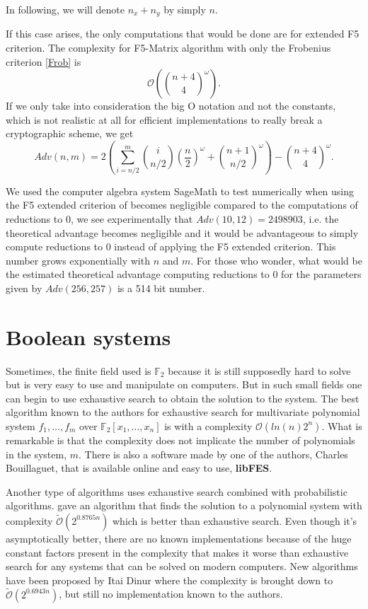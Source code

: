 \documentclass[english]{article}
\begin{document}
		 In following, we will denote $n_x + n_y$ by simply $n$.
		 
		 If this case arises, the only computations that would be done are for extended F5 criterion. The complexity for F5-Matrix algorithm with only the Frobenius criterion \ref{Frob} is 
		 $$
		 \mathcal{O}\left(\binom{n + 4}{4}^\omega\right).
		 $$
		 If we only take into consideration the big O notation and not the constants, which is not realistic at all for efficient implementations to really break a cryptographic scheme, we get
		 \begin{equation}
		 Adv(n, m) = 2\left(\sum_{i = n/2}^{m}\binom{i}{n/2}\left(\frac{n}{2}\right)^\omega + \binom{n + 1}{n/2}^\omega\right) - \binom{n + 4}{4}^\omega.
		 \label{equation_complex}
		 \end{equation}
		 
		 We used the computer algebra system SageMath \cite{sagemath} to test numerically when using the F5 extended criterion of \cite{FSS11} becomes negligible compared to the computations of reductions to 0, we see experimentally that $Adv(10, 12) = 2498903$, i.e. the theoretical advantage becomes negligible and it would be advantageous to simply compute reductions to 0 instead of applying the F5 extended criterion. This number grows exponentially with $n$ and $m$. For those who wonder, what would be the estimated theoretical advantage computing reductions to 0 for the parameters given by \cite{HJ23} $Adv(256, 257)$ is a 514 bit number.
		 
	\section{Boolean systems}
		Sometimes, the finite field used is $\mathbb{F}_2$ because it is still supposedly hard to solve but is very easy to use and manipulate on computers. But in such small fields one can begin to use exhaustive search to obtain the solution to the system. The best algorithm known to the authors for exhaustive search for multivariate polynomial system $f_1,\dots,f_m$ over $\mathbb{F}_2[x_1,\dots,x_n]$ is \cite{BCC+10} with a complexity $\mathcal{O}(ln(n)2^n)$. What is remarkable is that the complexity does not implicate the number of polynomials in the system, $m$. There is also a software made by one of the authors, Charles Bouillaguet, that is available online and easy to use, \textbf{libFES}.
		
		Another type of algorithms uses exhaustive search combined with probabilistic algorithms. \cite{LPT+17} gave an algorithm that finds the solution to a polynomial system with complexity $\tilde{\mathcal{O}}(2^{0.8765n})$ which is better than exhaustive search. Even though it's asymptotically better, there are no known implementations because of the huge constant factors present in the complexity that makes it worse than exhaustive search for any systems that can be solved on modern computers. New algorithms have been proposed by Itai Dinur \cite{Itai21A, Itai21B} where the complexity is brought down to $\tilde{\mathcal{O}}(2^{0.6943n})$, but still no implementation known to the authors.
		
\end{document}
